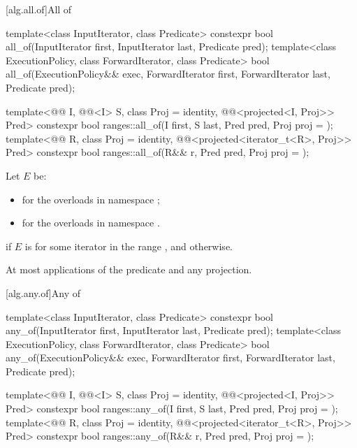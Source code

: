 [alg.all.of]{All of}

%
\begin{itemdecl}
template<class InputIterator, class Predicate>
  constexpr bool all_of(InputIterator first, InputIterator last, Predicate pred);
template<class ExecutionPolicy, class ForwardIterator, class Predicate>
  bool all_of(ExecutionPolicy&& exec, ForwardIterator first, ForwardIterator last,
              Predicate pred);

template<@@ I, @@<I> S, class Proj = identity,
         @@<projected<I, Proj>> Pred>
  constexpr bool ranges::all_of(I first, S last, Pred pred, Proj proj = {});
template<@@ R, class Proj = identity,
         @@<projected<iterator_t<R>, Proj>> Pred>
  constexpr bool ranges::all_of(R&& r, Pred pred, Proj proj = {});
\end{itemdecl}

\begin{itemdescr}
\pnum
Let $E$ be:
\begin{itemize}
\item
   for the overloads in namespace ;
\item
  for the overloads in namespace .
\end{itemize}

\pnum
\returns
{} if $E$ is 
for some iterator  in the range , and
 otherwise.

\pnum
\complexity
At most  applications of the predicate and any projection.
\end{itemdescr}

[alg.any.of]{Any of}

%
\begin{itemdecl}
template<class InputIterator, class Predicate>
  constexpr bool any_of(InputIterator first, InputIterator last, Predicate pred);
template<class ExecutionPolicy, class ForwardIterator, class Predicate>
  bool any_of(ExecutionPolicy&& exec, ForwardIterator first, ForwardIterator last,
              Predicate pred);

template<@@ I, @@<I> S, class Proj = identity,
         @@<projected<I, Proj>> Pred>
  constexpr bool ranges::any_of(I first, S last, Pred pred, Proj proj = {});
template<@@ R, class Proj = identity,
         @@<projected<iterator_t<R>, Proj>> Pred>
  constexpr bool ranges::any_of(R&& r, Pred pred, Proj proj = {});
\end{itemdecl}

